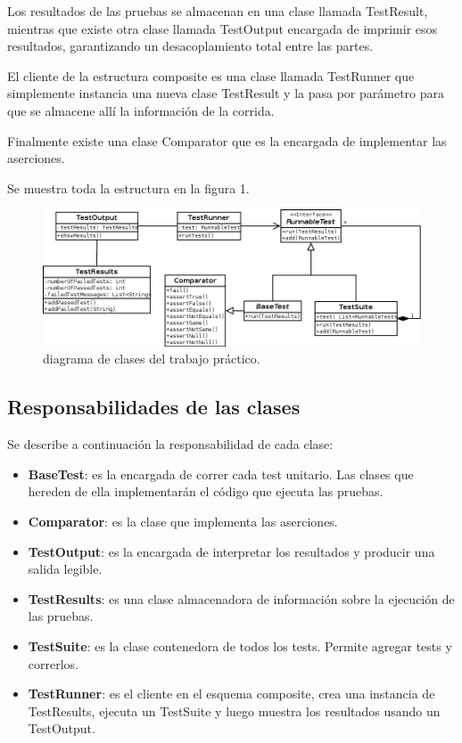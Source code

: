 \documentclass[12pt]{article}
\begin{document}
Los resultados de las pruebas se almacenan en una clase llamada TestResult,
mientras que existe otra clase llamada TestOutput encargada de imprimir esos
resultados, garantizando un desacoplamiento total entre las partes.

El cliente de la estructura composite es una clase llamada TestRunner que
simplemente instancia una nueva clase TestResult y la pasa por parámetro para 
que se almacene allí la información de la corrida.

Finalmente existe una clase Comparator que es la encargada de implementar las 
aserciones.

Se muestra toda la estructura en la figura 1.

\begin{figure}[h]
\begin{center}
	\includegraphics[scale=0.50,angle=90]{./ClassDiagram}
\end{center}
	\caption{diagrama de clases del trabajo práctico.}
\end{figure}

\subsection{Responsabilidades de las clases}
Se describe a continuación la responsabilidad de cada clase:
\begin{itemize}
	\item \textbf{BaseTest}: es la encargada de correr cada test unitario.
		Las clases que hereden de ella implementarán el código que 
		ejecuta las pruebas. 
		
	\item \textbf{Comparator}: es la clase que implementa las aserciones.	
	
	\item \textbf{TestOutput}: es la encargada de interpretar los resultados
		y producir una salida legible.		
			
	\item \textbf{TestResults}: es una clase almacenadora de información
		sobre la ejecución de las pruebas.
	
	\item \textbf{TestSuite}: es la clase contenedora de todos los tests.
		Permite agregar tests y correrlos.
		
	\item \textbf{TestRunner}: es el cliente en el esquema composite, crea
		una instancia de TestResults, ejecuta un TestSuite y luego
		muestra los resultados usando un TestOutput.		

\end{itemize}
\end{document}
